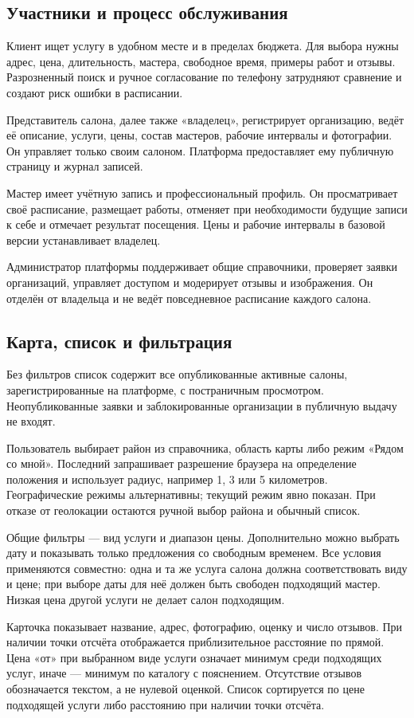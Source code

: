 \subsection{Участники и процесс обслуживания}
Клиент ищет услугу в удобном месте и в пределах бюджета. Для выбора нужны адрес, цена, длительность, мастера, свободное время, примеры работ и отзывы. Разрозненный поиск и ручное согласование по телефону затрудняют сравнение и создают риск ошибки в расписании.

Представитель салона, далее также «владелец», регистрирует организацию, ведёт её описание, услуги, цены, состав мастеров, рабочие интервалы и фотографии. Он управляет только своим салоном. Платформа предоставляет ему публичную страницу и журнал записей.

Мастер имеет учётную запись и профессиональный профиль. Он просматривает своё расписание, размещает работы, отменяет при необходимости будущие записи к себе и отмечает результат посещения. Цены и рабочие интервалы в базовой версии устанавливает владелец.

Администратор платформы поддерживает общие справочники, проверяет заявки организаций, управляет доступом и модерирует отзывы и изображения. Он отделён от владельца и не ведёт повседневное расписание каждого салона.

\subsection{Карта, список и фильтрация}
Без фильтров список содержит все опубликованные активные салоны, зарегистрированные на платформе, с постраничным просмотром. Неопубликованные заявки и заблокированные организации в публичную выдачу не входят.

Пользователь выбирает район из справочника, область карты либо режим «Рядом со мной». Последний запрашивает разрешение браузера на определение положения и использует радиус, например 1, 3 или 5 километров. Географические режимы альтернативны; текущий режим явно показан. При отказе от геолокации остаются ручной выбор района и обычный список.

Общие фильтры --- вид услуги и диапазон цены. Дополнительно можно выбрать дату и показывать только предложения со свободным временем. Все условия применяются совместно: одна и та же услуга салона должна соответствовать виду и цене; при выборе даты для неё должен быть свободен подходящий мастер. Низкая цена другой услуги не делает салон подходящим.

Карточка показывает название, адрес, фотографию, оценку и число отзывов. При наличии точки отсчёта отображается приблизительное расстояние по прямой. Цена «от» при выбранном виде услуги означает минимум среди подходящих услуг, иначе --- минимум по каталогу с пояснением. Отсутствие отзывов обозначается текстом, а не нулевой оценкой. Список сортируется по цене подходящей услуги либо расстоянию при наличии точки отсчёта.

